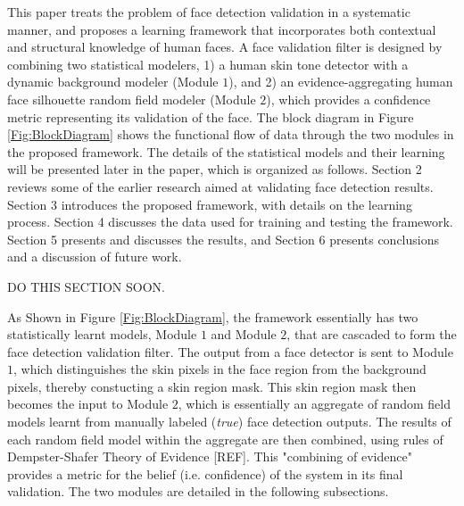 \documentclass[times, 10pt,twocolumn]{article}
\begin{document}
This paper treats the problem of face detection validation in a
systematic manner, and proposes a learning framework that
incorporates both contextual and structural knowledge of human
faces. A face validation filter is designed by combining two
statistical modelers, 1) a human skin tone detector with a dynamic
background modeler (Module $1$), and 2) an evidence-aggregating
human face silhouette random field modeler (Module $2$), which
provides a confidence metric representing its validation of the
face. The block diagram in Figure \ref{Fig:BlockDiagram} shows the
functional flow of data through the two modules in the proposed
framework. The details of the statistical models and their learning
will be presented later in the paper, which is organized as follows.
Section 2 reviews some of the earlier research aimed at validating
face detection results. Section 3 introduces the proposed framework,
with details on the learning process. Section 4 discusses the data
used for training and testing the framework. Section 5 presents and
discusses the results, and Section 6 presents conclusions and a
discussion of future work.

\label{RelatedWork}

DO THIS SECTION SOON.

\label{ProposedFramework} As Shown in
Figure \ref{Fig:BlockDiagram}, the framework essentially has two
statistically learnt models, Module $1$ and Module $2$, that are
cascaded to form the face detection validation filter. The output
from a face detector is sent to Module $1$, which
distinguishes the skin pixels in the face region from the
background pixels, thereby constucting a skin region mask.
This skin region mask then becomes the input to Module $2$, which is
essentially an aggregate of random field models learnt from manually
labeled ({\it true}) face detection outputs. The results of each
random field model within the aggregate are then combined, using
rules of Dempster-Shafer Theory of Evidence [REF]. This "combining of
evidence" provides a metric for the belief (i.e. confidence) of the system in its final
validation. The two modules are detailed in the
following subsections.
\label{Module1}
\end{document}
